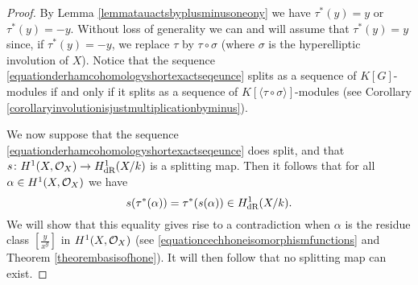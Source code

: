     \begin{proof}
    By Lemma \ref{lemmatauactsbyplusminusoneony} we have $\tau^*(y) = y$ or $\tau^*(y) = -y$.
    Without loss of generality we can and will assume that $\tau^*(y) = y$ since, if $\tau^*(y) = -y$, we replace $\tau$ by $\tau \circ \sigma$ (where $\sigma$ is the hyperelliptic involution of $X$).
    Notice that the sequence \eqref{equationderhamcohomologyshortexactseqeunce} splits as a sequence of $K[G]$-modules if and only if it splits as a sequence of $K[\langle \tau \circ \sigma \rangle]$-modules (see Corollary \ref{corollaryinvolutionisjustmultiplicationbyminus}).
    
    We now suppose that the sequence \eqref{equationderhamcohomologyshortexactseqeunce} does split, and that $s \colon H^1(X,\mathcal{O}_X) \rightarrow H_{\text {dR}}^1(X/k)$ is a splitting map.
    Then it follows that for all $\alpha \in H^1(X,\mathcal{O}_X)$ we have
        \begin{equation}\label{equationcommutativityoftauandsplittingmap}
        s(\tau^*(\alpha)) = \tau^*(s(\alpha)) \in H_{\text {dR}}^1(X/k).
        \end{equation}
    We will show that this equality gives rise to a contradiction when $\alpha$ is the residue class $\left[ \frac{y}{x^g}\right]$ in $H^1(X,\mathcal{O}_X)$ (see \eqref{equationcechhoneisomorphismfunctions} and Theorem \ref{theorembasisofhone}).  
    It will then follow that no splitting map can exist.


\end{proof}
